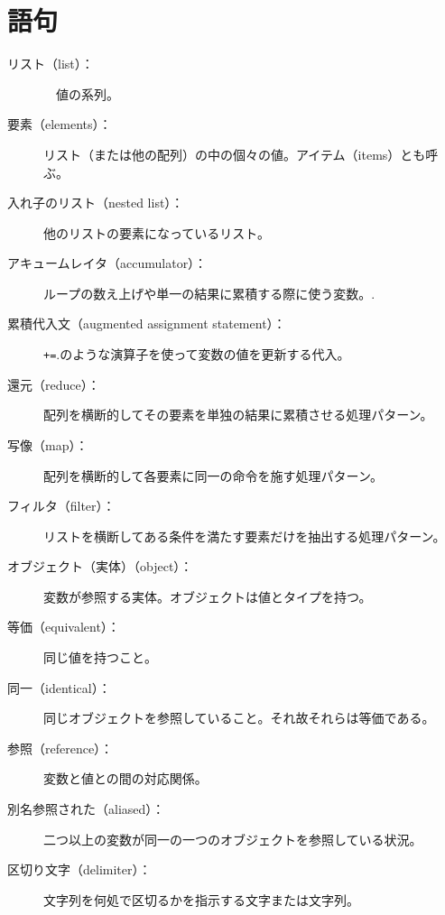 \documentclass[a4j,12pt,makeidx]{jbook}
\begin{document}
\section{語句}
\begin{description}

\item[リスト（list）：]　値の系列。 

\item[要素（elements）：] リスト（または他の配列）の中の個々の値。アイテム（items）とも呼ぶ。

\item[入れ子のリスト（nested list）：] 他のリストの要素になっているリスト。

\item[アキュームレイタ（accumulator）：] ループの数え上げや単一の結果に累積する際に使う変数。.

\item[累積代入文（augmented assignment statement）：] {\verb"+="}.のような演算子を使って変数の値を更新する代入。

\item[還元（reduce）：] 配列を横断的してその要素を単独の結果に累積させる処理パターン。

\item[写像（map）：] 配列を横断的して各要素に同一の命令を施す処理パターン。

\item[フィルタ（filter）：] リストを横断してある条件を満たす要素だけを抽出する処理パターン。

\item[オブジェクト（実体）（object）：] 変数が参照する実体。オブジェクトは値とタイプを持つ。

\item[等価（equivalent）：] 同じ値を持つこと。

\item[同一（identical）：] 同じオブジェクトを参照していること。それ故それらは等価である。

\item[参照（reference）：] 変数と値との間の対応関係。

\item[別名参照された（aliased）：] 二つ以上の変数が同一の一つのオブジェクトを参照している状況。

\item[区切り文字（delimiter）：] 文字列を何処で区切るかを指示する文字または文字列。

\end{description}
%
\end{document}
